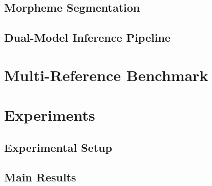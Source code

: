 \documentclass[11pt]{article}
\begin{document}
\subsection{Morpheme Segmentation}

\subsection{Dual-Model Inference Pipeline}

\section{Multi-Reference Benchmark}
\label{sec:benchmark}


\section{Experiments}
\label{sec:experiments}

\subsection{Experimental Setup}

\subsection{Main Results}

\end{document}
